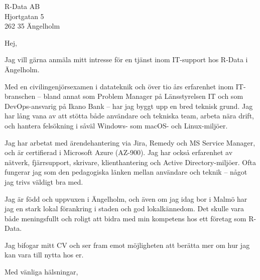 \documentclass[a4paper,11pt]{letter}
\date{\today}
\begin{document}
\begin{letter}{R-Data AB\\Hjortgatan 5\\262 35 Ängelholm}

\opening{Hej,}

Jag vill gärna anmäla mitt intresse för en tjänst inom IT-support hos R-Data i Ängelholm.

Med en civilingenjörsexamen i datateknik och över tio års erfarenhet inom IT-branschen – bland annat som Problem Manager på Länsstyrelsen IT och som DevOps-ansvarig på Ikano Bank – har jag byggt upp en bred teknisk grund. Jag har lång vana av att stötta både användare och tekniska team, arbeta nära drift, och hantera felsökning i såväl Windows- som macOS- och Linux-miljöer.

Jag har arbetat med ärendehantering via Jira, Remedy och MS Service Manager, och är certifierad i Microsoft Azure (AZ-900). Jag har också erfarenhet av nätverk, fjärrsupport, skrivare, klienthantering och Active Directory-miljöer. Ofta fungerar jag som den pedagogiska länken mellan användare och teknik – något jag trivs väldigt bra med.

Jag är född och uppvuxen i Ängelholm, och även om jag idag bor i Malmö har jag en stark lokal förankring i staden och god lokalkännedom. Det skulle vara både meningsfullt och roligt att bidra med min kompetens hos ett företag som R-Data.

Jag bifogar mitt CV och ser fram emot möjligheten att berätta mer om hur jag kan vara till nytta hos er.

\closing{Med vänliga hälsningar,}

\end{letter}
\end{document}
